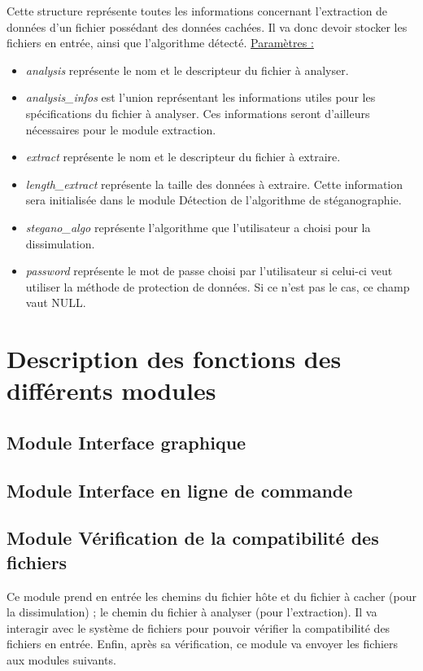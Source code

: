 \documentclass[11pt]{article}
\begin{document}
Cette structure représente toutes les informations concernant l'extraction
de données d'un fichier possédant des données cachées. Il va donc devoir 
stocker les fichiers en entrée, ainsi que l'algorithme détecté. \newline
\underline{Paramètres :}
\begin{itemize}
\item \textit{analysis} représente le nom et le descripteur du fichier à analyser.  
\item \textit{analysis\_infos} est l'union représentant les informations utiles pour 
les spécifications du fichier à analyser. Ces informations seront d'ailleurs 
nécessaires pour le module extraction. 
\item \textit{extract} représente le nom et le descripteur du fichier à extraire. 
\item \textit{length\_extract} représente la taille des données à extraire. Cette 
information sera initialisée dans le module Détection de l'algorithme de 
stéganographie. 
\item \textit{stegano\_algo} représente l'algorithme que l'utilisateur a choisi 
pour la dissimulation.
\item \textit{password} représente le mot de passe choisi par l'utilisateur si 
celui-ci veut utiliser la méthode de protection de données. Si ce n'est 
pas le cas, ce champ vaut NULL. 
\newline
\end{itemize}

\section{Description des fonctions des différents modules}

\subsection{Module Interface graphique}
\subsection{Module Interface en ligne de commande}

\subsection{Module Vérification de la compatibilité des fichiers}

Ce module prend en entrée les chemins du fichier hôte et du fichier à 
cacher (pour la dissimulation) ; le chemin du fichier à analyser (pour 
l'extraction). Il va interagir avec le système de fichiers pour pouvoir 
vérifier la compatibilité des fichiers en entrée. 
Enfin, après sa vérification, ce module va envoyer les fichiers aux modules 
suivants. 
\newline
\end{document}
